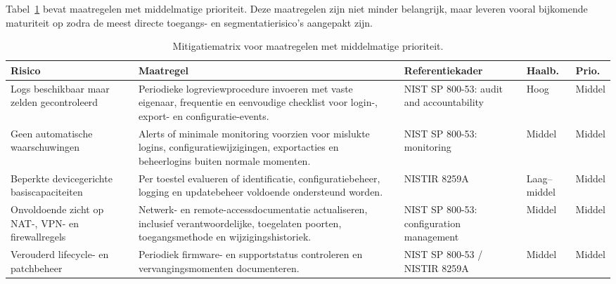 Tabel~\ref{tab:mitigatie-middel} bevat maatregelen met middelmatige prioriteit. Deze maatregelen zijn niet minder belangrijk, maar leveren vooral bijkomende maturiteit op zodra de meest directe toegangs- en segmentatierisico's aangepakt zijn.

\begin{table}[htbp]
    \centering
    \scriptsize
    \renewcommand{\arraystretch}{1.2}
    \caption[Mitigatiematrix met middelmatige prioriteit]{Mitigatiematrix voor maatregelen met middelmatige prioriteit.}
    \label{tab:mitigatie-middel}
    \begin{tabular}{p{}p{}p{}p{}p{}}
        \hline
        \textbf{Risico} & \textbf{Maatregel} & \textbf{Referentiekader} & \textbf{Haalb.} & \textbf{Prio.} \\
        \hline
        Logs beschikbaar maar zelden gecontroleerd & Periodieke logreviewprocedure invoeren met vaste eigenaar, frequentie en eenvoudige checklist voor login-, export- en configuratie-events. & NIST SP 800-53: audit and accountability & Hoog & Middel \\
        \hline
        Geen automatische waarschuwingen & Alerts of minimale monitoring voorzien voor mislukte logins, configuratiewijzigingen, exportacties en beheerlogins buiten normale momenten. & NIST SP 800-53: monitoring & Middel & Middel \\
        \hline
        Beperkte devicegerichte basiscapaciteiten & Per toestel evalueren of identificatie, configuratiebeheer, logging en updatebeheer voldoende ondersteund worden. & NISTIR 8259A & Laag--middel & Middel \\
        \hline
        Onvoldoende zicht op NAT-, VPN- en firewallregels & Netwerk- en remote-accessdocumentatie actualiseren, inclusief verantwoordelijke, toegelaten poorten, toegangsmethode en wijzigingshistoriek. & NIST SP 800-53: configuration management & Middel & Middel \\
        \hline
        Verouderd lifecycle- en patchbeheer & Periodiek firmware- en supportstatus controleren en vervangingsmomenten documenteren. & NIST SP 800-53 / NISTIR 8259A & Middel & Middel \\
        \hline
    \end{tabular}
\end{table}


